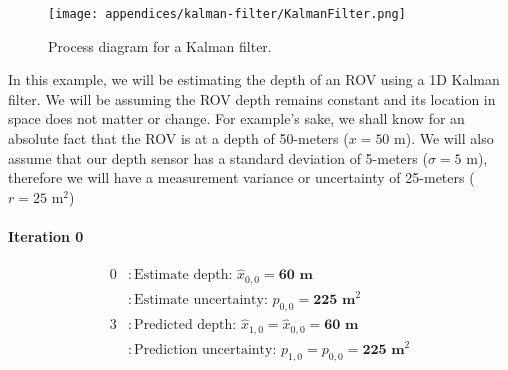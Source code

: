\begin{figure}[h!]
    \texttt{[image: appendices/kalman-filter/KalmanFilter.png]}
    \caption[Kalman Filter Diagram]{Process diagram for a Kalman filter.}
\end{figure}

\begin{fitbox}[frametitle=Example]
    In this example, we will be estimating the depth of an ROV using a 1D Kalman filter.
    We will be assuming the ROV depth remains constant and its location in space does not matter or change.
    For example's sake, we shall know for an absolute fact that the ROV is at a depth of 50-meters ($x=50 \text{ m}$).
    We will also assume that our depth sensor has a standard deviation of 5-meters ($\sigma=5 \text{ m}$), therefore we will have a measurement variance or uncertainty of 25-meters ($r=25 \text{ m}^2$)

    \paragraph*{Iteration 0}
    \begin{equation*}
        \begin{aligned}
            0 &: \text{Estimate depth: } \hat{x}_{0,0} = \textbf{60 m} \\
                &: \text{Estimate uncertainty: } p_{0,0} = \textbf{225 m}^2 \\
            3 &: \text{Predicted depth: } \hat{x}_{1,0} = \hat{x}_{0,0} = \textbf{60 m} \\
                &: \text{Prediction uncertainty: } p_{1,0} = p_{0,0} = \textbf{225 m}^2 \\
        \end{aligned}
    \end{equation*}


\end{fitbox}

